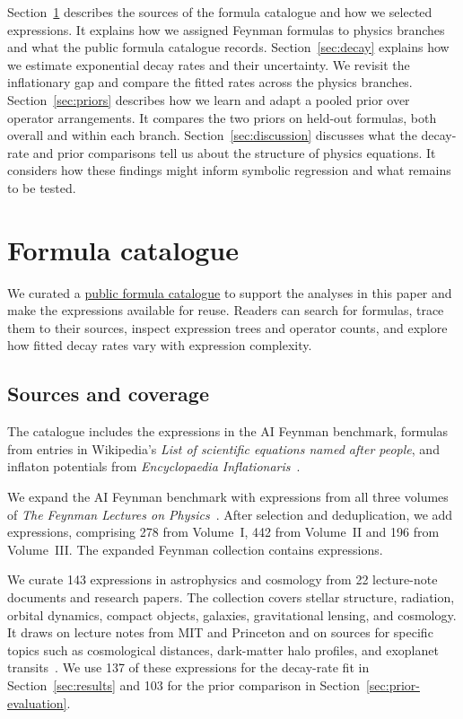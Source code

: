 \documentclass[10pt]{article}
\begin{document}
Section~\ref{sec:data} describes the sources of the formula catalogue and how we selected expressions. It explains how we assigned Feynman formulas to physics branches and what the public formula catalogue records. Section~\ref{sec:decay} explains how we estimate exponential decay rates and their uncertainty. We revisit the inflationary gap and compare the fitted rates across the physics branches. Section~\ref{sec:priors} describes how we learn and adapt a pooled prior over operator arrangements. It compares the two priors on held-out formulas, both overall and within each branch. Section~\ref{sec:discussion} discusses what the decay-rate and prior comparisons tell us about the structure of physics equations. It considers how these findings might inform symbolic regression and what remains to be tested.

\section{Formula catalogue}\label{sec:data}

We curated a \href{https://jaysen-ma.github.io/physics-priors/data/catalog/index.html}{public formula catalogue} to support the analyses in this paper and make the expressions available for reuse. Readers can search for formulas, trace them to their sources, inspect expression trees and operator counts, and explore how fitted decay rates vary with expression complexity.

\subsection{Sources and coverage}
The catalogue includes the \nFeynBench{} expressions in the AI Feynman benchmark, \nWiki{} formulas from entries in Wikipedia's \textit{List of scientific equations named after people}, and \nEI{} inflaton potentials from \textit{Encyclopaedia Inflationaris}~\citep{constantin2026,udrescu2020,wikinamed,martin2014}.

We expand the AI Feynman benchmark with expressions from all three volumes of \textit{The Feynman Lectures on Physics}~\citep{feynman}. After selection and deduplication, we add \nLectAdded{} expressions, comprising 278 from Volume~I, 442 from Volume~II and 196 from Volume~III. The expanded Feynman collection contains \nFeynAll{} expressions.

We curate 143 expressions in astrophysics and cosmology from 22 lecture-note documents and research papers. The collection covers stellar structure, radiation, orbital dynamics, compact objects, galaxies, gravitational lensing, and cosmology. It draws on lecture notes from MIT and Princeton and on sources for specific topics such as cosmological distances, dark-matter halo profiles, and exoplanet transits~\citep{vogelsberger2023,princetonast403,tongcosmology,hogg2000,navarro1997,winn2010}. We use 137 of these expressions for the decay-rate fit in Section~\ref{sec:results} and 103 for the prior comparison in Section~\ref{sec:prior-evaluation}.
\end{document}
